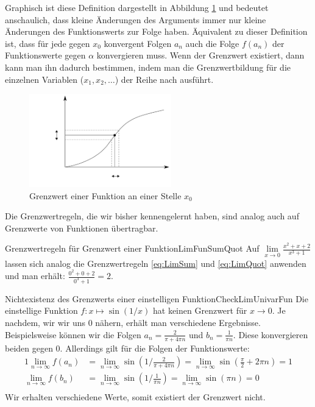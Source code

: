 Graphisch ist diese Definition dargestellt in Abbildung \ref{fig:LimFun} und bedeutet anschaulich, dass kleine Änderungen des Arguments immer nur kleine Änderungen des Funktionswerts zur Folge haben. Äquivalent zu dieser Definition ist, dass für jede gegen $x_0$ konvergent Folgen $a_n$ auch die Folge $f(a_n)$ der Funktionswerte gegen $\alpha$ konvergieren muss. Wenn der Grenzwert existiert, dann kann man ihn dadurch bestimmen, indem man die Grenzwertbildung für die einzelnen Variablen ($x_1, x_2, \dots$) der Reihe nach ausführt.

\begin{figure}
    \centering
    \includegraphics[width=0.55\textwidth]{./svg/definition-convergence-point}
    \caption[Grenzwert einer Funktion]{Grenzwert einer Funktion an einer Stelle $x_0$}
    \label{fig:LimFun}
\end{figure}

Die Grenzwertregeln, die wir bisher kennengelernt haben, sind analog auch auf Grenzwerte von Funktionen übertragbar.

\begin{example}{Grenzwertregeln für Grenzwert einer Funktion}{LimFunSumQuot}
    Auf $\lim\limits_{x\to 0} \frac{x^2+x+2}{x^3+1}$ lassen sich analog die Grenzwertregeln \ref{eq:LimSum} und \ref{eq:LimQuot} anwenden und man erhält: $\frac{0^2+0+2}{0^3+1} = 2$.
\end{example}

\begin{example}{Nichtexistenz des Grenzwerts einer einstelligen Funktion}{CheckLimUnivarFun}
    Die einstellige Funktion $f: x \mapsto \sin(1/x)$ hat keinen Grenzwert für $x \to 0$. Je nachdem, wir wir uns $0$ nähern, erhält man verschiedene Ergebnisse. Beispielsweise können wir die Folgen $a_n = \frac{2}{\pi+4\pi n}$ und $b_n = \frac{1}{\pi n}$. Diese konvergieren beiden gegen $0$. Allerdings gilt für die Folgen der Funktionswerte:
    \begin{alignat}{1}
       \lim\limits_{n\to\infty} f(a_n) &= \lim\limits_{n\to\infty} \sin\left(1 / \frac{2}{\pi+4\pi n}\right) = \lim\limits_{n\to\infty} \sin(\frac{\pi}{2} + 2\pi n) = 1 \\
       \lim\limits_{n\to\infty} f(b_n) &= \lim\limits_{n\to\infty} \sin\left(1 / \frac{1}{\pi n}\right) = \lim\limits_{n\to\infty} \sin(\pi n) = 0 \\
    \end{alignat}
    Wir erhalten verschiedene Werte, somit existiert der Grenzwert nicht.
\end{example}

